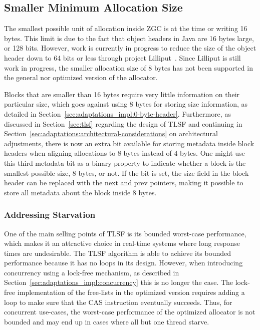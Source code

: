 
\subsection{Smaller Minimum Allocation Size}
\label{sec:future-work:lilliput}

The smallest possible unit of allocation inside ZGC is at the time or writing 16 bytes. This limit is due to the fact that object headers in Java are 16 bytes large, or 128 bits. However, work is currently in progress to reduce the size of the object header down to 64 bits or less through project Lilliput~\cite{lilliput}. Since Lilliput is still work in progress, the smaller allocation size of 8 bytes has not been supported in the general nor optimized version of the allocator.

Blocks that are smaller than 16 bytes require very little information on their particular size, which goes against using 8 bytes for storing size information, as detailed in Section~\ref{sec:adaptations_impl:0-byte-header}. Furthermore, as discussed in Section~\ref{sec:tlsf} regarding the design of TLSF and continuing in Section~\ref{sec:adaptations:architectural-considerations} on architectural adjustments, there is now an extra bit available for storing metadata inside block headers when aligning allocations to 8 bytes instead of 4 bytes. One might use this third metadata bit as a binary property to indicate whether a block is the smallest possible size, 8 bytes, or not. If the bit is set, the size field in the block header can be replaced with the next and prev pointers, making it possible to store all metadata about the block inside 8 bytes.


\subsubsection{Addressing Starvation}

One of the main selling points of TLSF is its bounded worst-case performance, which makes it an attractive choice in real-time systems where long response times are undesirable. The TLSF algorithm is able to achieve its bounded performance because it has no loops in its design. However, when introducing concurrency using a lock-free mechanism, as described in Section~\ref{sec:adaptations_impl:concurrency} this is no longer the case. The lock-free implementation of the free-lists in the optimized version requires adding a loop to make sure that the CAS instruction eventually succeeds. Thus, for concurrent use-cases, the worst-case performance of the optimized allocator is not bounded and may end up in cases where all but one thread starve. 

